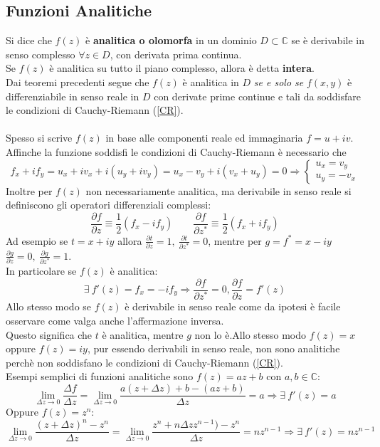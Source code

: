 \documentclass[twoside]{article}
\begin{document}
\subsection{Funzioni Analitiche}
	Si dice che $f(z)$ è \textbf{analitica o olomorfa} in un dominio $D\subset \mathbb{C}$ se è derivabile in senso complesso $\forall z \in D$, con derivata prima continua.\\
	Se $f(z)$ è analitica su tutto il piano complesso, allora è detta \textbf{intera}.\\
	Dai teoremi precedenti segue che $f(z)$ è analitica in $D$ \textit{se e solo se} $f(x,y)$ è differenziabile in senso reale in $D$ con derivate prime continue e tali da soddisfare le condizioni di Cauchy-Riemann (\ref{CR}).\\
	\\
	Spesso si scrive $f(z)$ in base alle componenti reale ed immaginaria $f=u+iv$.\\
	Affinche la funzione soddisfi le condizioni di Cauchy-Riemann è necessario che
	\begin{equation}
		f_x+if_y=u_x+iv_x+i(u_y+iv_y)=u_x-v_y+i(v_x+u_y)=0 \Longrightarrow \begin{cases}
		u_x=v_y\\u_y=-v_x
		\end{cases}
	\end{equation}
	Inoltre per $f(z)$ non necessariamente analitica, ma derivabile in senso reale si definiscono gli operatori differenziali complessi:
	\begin{equation}
	\frac{\partial f}{\partial z}\equiv \frac{1}{2}(f_x-if_y) \qquad	\frac{\partial f}{\partial z^*}\equiv \frac{1}{2}(f_x+if_y)
	\end{equation}
	Ad esempio se $t=x+iy$ allora $\frac{\partial t}{\partial z}=1,\ \frac{\partial t}{\partial z^*}=0$, mentre per $g=f^*=x-iy$ $\frac{\partial g}{\partial z}=0,\ \frac{\partial g}{\partial z^*}=1$.\\
	In particolare se $f(z)$ è analitica:
	\begin{equation}
	\exists\ f'(z)=f_x=-if_y \Longrightarrow \frac{\partial f}{\partial z^*}=0, \frac{\partial f}{\partial z}= f'(z)
	\end{equation}
	Allo stesso modo se $f(z)$ è derivabile in senso reale come da ipotesi è facile osservare come valga anche l'affermazione inversa.\\
	Questo significa che $t$ è analitica, mentre $g$ non lo è.Allo stesso modo $f(z)=x$ oppure $f(z)=iy$, pur essendo derivabili in senso reale, non sono analitiche perchè non soddisfano le condizioni di Cauchy-Riemann (\ref{CR}).\\
	Esempi semplici di funzioni analitiche sono $f(z)=az+b$ con $a,b \in \mathds{C}$:
	\begin{equation}
		\lim\limits_{\Delta z\to 0}\frac{\Delta f}{\Delta z}=\lim\limits_{\Delta z\to 0}\frac{a(z+\Delta z)+b-(az+b)}{\Delta z}=a \Longrightarrow \exists\ f'(z)=a
	\end{equation}
	Oppure $f(z)=z^n$:
	\begin{equation}
	\lim\limits_{\Delta z\to 0}\frac{(z+\Delta z)^n-z^n}{\Delta z}=\lim\limits_{\Delta z\to 0}\frac{z^n+n\Delta zz^{n-1})-z^n}{\Delta z}=nz^{n-1} \Longrightarrow \exists\ f'(z)=nz^{n-1}
	\end{equation}
\end{document}
